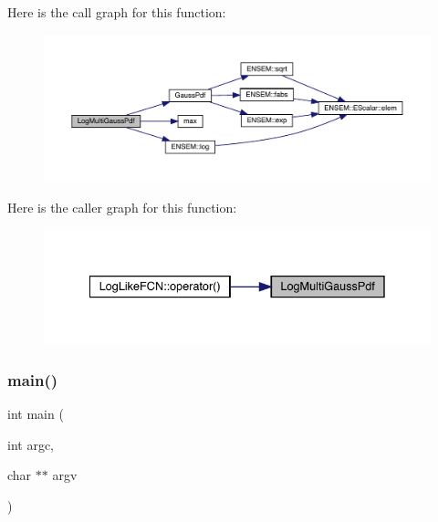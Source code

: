 Here is the call graph for this function\+:
\nopagebreak
\begin{figure}[H]
\begin{center}
\leavevmode
\includegraphics[width=350pt]{d7/df1/adat-devel_2other__libs_2minuit_2test_2MnSim_2ParallelTest_8cxx_a3dbc0f5a3a5823d5a68abacc83894768_cgraph}
\end{center}
\end{figure}
Here is the caller graph for this function\+:
\nopagebreak
\begin{figure}[H]
\begin{center}
\leavevmode
\includegraphics[width=335pt]{d7/df1/adat-devel_2other__libs_2minuit_2test_2MnSim_2ParallelTest_8cxx_a3dbc0f5a3a5823d5a68abacc83894768_icgraph}
\end{center}
\end{figure}
\mbox{\label{adat-devel_2other__libs_2minuit_2test_2MnSim_2ParallelTest_8cxx_a3c04138a5bfe5d72780bb7e82a18e627}} 
\subsubsection{\texorpdfstring{main()}{main()}}
{\footnotesize\ttfamily int main (\begin{DoxyParamCaption}\item[{int}]{argc,  }\item[{char $\ast$$\ast$}]{argv }\end{DoxyParamCaption})}

